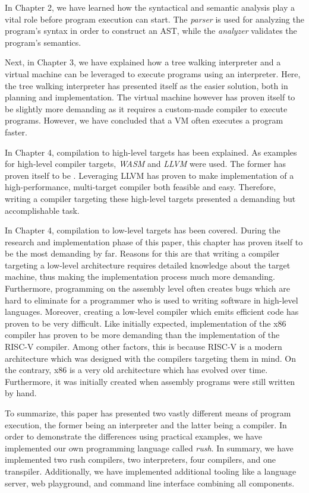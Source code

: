 In Chapter 2, we have learned how the syntactical and semantic analysis play a vital role before program execution can start.
The \emph{parser} is used for analyzing the program's syntax in order to construct an AST,
while the \emph{analyzer} validates the program's semantics.

Next, in Chapter 3, we have explained how a tree walking interpreter and a virtual machine can be leveraged to execute programs using an interpreter.
Here, the tree walking interpreter has presented itself as the easier solution, both in planning and implementation.
The virtual machine however has proven itself to be slightly more demanding as it requires a custom-made compiler to execute programs.
However, we have concluded that a VM often executes a program faster.

In Chapter 4, compilation to high-level targets has been explained.
As examples for high-level compiler targets, \emph{WASM} and \emph{LLVM} were used.
The former has proven itself to be .
Leveraging LLVM has proven to make implementation of a high-performance, multi-target compiler both feasible and easy.
Therefore, writing a compiler targeting these high-level targets presented a demanding but accomplishable task.

In Chapter 4, compilation to low-level targets has been covered.
During the research and implementation phase of this paper,
this chapter has proven itself to be the most demanding by far.
Reasons for this are that writing a compiler targeting a low-level architecture
requires detailed knowledge about the target machine, thus making the implementation process much more demanding.
Furthermore, programming on the assembly level often creates bugs which are hard to eliminate for a programmer who is used to writing software in high-level languages.
Moreover, creating a low-level compiler which emits efficient code has proven to be very difficult.
Like initially expected, implementation of the x86 compiler has proven to be more demanding than the implementation of the RISC-V compiler.
Among other factors, this is because RISC-V is a modern architecture which was designed with the compilers targeting them in mind.
On the contrary, x86 is a very old architecture which has evolved over time.
Furthermore, it was initially created when assembly programs were still written by hand.

To summarize, this paper has presented two vastly different means of program execution,
the former being an interpreter and the latter being a compiler.
In order to demonstrate the differences using practical examples,
we have implemented our own programming language called \emph{rush}.
In summary, we have implemented two rush compilers, two interpreters, four compilers, and one transpiler.
Additionally, we have implemented additional tooling like a language server, web playground, and command line interface combining all components.
